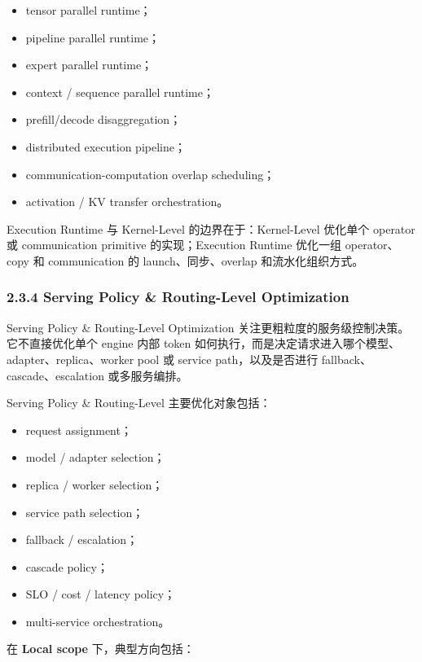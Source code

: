 \documentclass[a4paper,twocolumn,10pt]{ctexart}
\begin{document}
\begin{itemize}
\item tensor parallel runtime；

\item pipeline parallel runtime；

\item expert parallel runtime；

\item context / sequence parallel runtime；

\item prefill/decode disaggregation；

\item distributed execution pipeline；

\item communication-computation overlap scheduling；

\item activation / KV transfer orchestration。

\end{itemize}
Execution Runtime 与 Kernel-Level 的边界在于：Kernel-Level 优化单个 operator 或 communication primitive 的实现；Execution Runtime 优化一组 operator、copy 和 communication 的 launch、同步、overlap 和流水化组织方式。




\subsubsection{2.3.4 Serving Policy \& Routing-Level Optimization}

Serving Policy \& Routing-Level Optimization 关注更粗粒度的服务级控制决策。它不直接优化单个 engine 内部 token 如何执行，而是决定请求进入哪个模型、adapter、replica、worker pool 或 service path，以及是否进行 fallback、cascade、escalation 或多服务编排。


Serving Policy \& Routing-Level 主要优化对象包括：


\begin{itemize}
\item request assignment；

\item model / adapter selection；

\item replica / worker selection；

\item service path selection；

\item fallback / escalation；

\item cascade policy；

\item SLO / cost / latency policy；

\item multi-service orchestration。

\end{itemize}
在 \textbf{Local scope} 下，典型方向包括：
\end{document}
